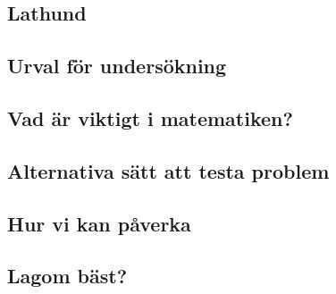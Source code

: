 \documentclass[11pt,a4paper]{article}
\begin{document}
    \subsection{Lathund}
        
    
    \subsection{Urval för undersökning}
        
        
    \subsection{Vad är viktigt i matematiken?}
        
        
    \subsection{Alternativa sätt att testa problem}
        
        
    \subsection{Hur vi kan påverka}
        

    \subsection{Lagom bäst?}
        
        

\newpage
\begin{thebibliography}{3}
    
\end{thebibliography}

\newpage
{}
\appendix


\end{document}
